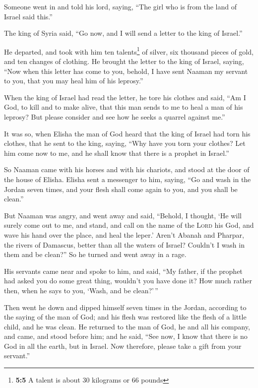  Someone went in and told his lord, saying, ``The girl who
is from the land of Israel said this.''

 The king of Syria said, ``Go now, and I will send a
letter to the king of Israel.''

He departed, and took with him ten talents\footnote{\textbf{5:5} A
  talent is about 30 kilograms or 66 pounds} of silver, six thousand
pieces of gold, and ten changes of clothing.  He brought
the letter to the king of Israel, saying, ``Now when this letter has
come to you, behold, I have sent Naaman my servant to you, that you may
heal him of his leprosy.''

 When the king of Israel had read the letter, he tore his
clothes and said, ``Am I God, to kill and to make alive, that this man
sends to me to heal a man of his leprosy? But please consider and see
how he seeks a quarrel against me.''

 It was so, when Elisha the man of God heard that the king
of Israel had torn his clothes, that he sent to the king, saying, ``Why
have you torn your clothes? Let him come now to me, and he shall know
that there is a prophet in Israel.''

 So Naaman came with his horses and with his chariots, and
stood at the door of the house of Elisha.  Elisha sent a
messenger to him, saying, ``Go and wash in the Jordan seven times, and
your flesh shall come again to you, and you shall be clean.''

 But Naaman was angry, and went away and said, ``Behold,
I thought, `He will surely come out to me, and stand, and call on the
name of the \textsc{Lord} his God, and wave his hand over the place, and
heal the leper.'  Aren't Abanah and Pharpar, the rivers
of Damascus, better than all the waters of Israel? Couldn't I wash in
them and be clean?'' So he turned and went away in a rage.

 His servants came near and spoke to him, and said, ``My
father, if the prophet had asked you do some great thing, wouldn't you
have done it? How much rather then, when he says to you, `Wash, and be
clean?'\,''

 Then went he down and dipped himself seven times in the
Jordan, according to the saying of the man of God; and his flesh was
restored like the flesh of a little child, and he was clean.
 He returned to the man of God, he and all his company,
and came, and stood before him; and he said, ``See now, I know that
there is no God in all the earth, but in Israel. Now therefore, please
take a gift from your servant.''

